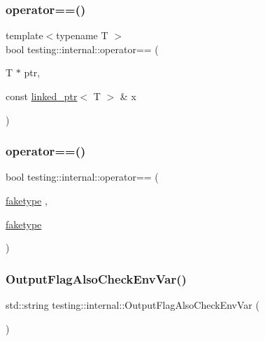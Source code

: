 \subsubsection{\texorpdfstring{operator==()}{operator==()}\hspace{0.1cm}{\footnotesize\ttfamily [1/2]}}
{\footnotesize\ttfamily template$<$typename T $>$ \\
bool testing\+::internal\+::operator== (\begin{DoxyParamCaption}\item[{T $\ast$}]{ptr,  }\item[{const \mbox{\hyperlink{classtesting_1_1internal_1_1linked__ptr}{linked\+\_\+ptr}}$<$ T $>$ \&}]{x }\end{DoxyParamCaption})\hspace{0.3cm}{\ttfamily [inline]}}

\mbox{\label{namespacetesting_1_1internal_a5e3e473798de3189e9343132bcfd4fea}} 
\subsubsection{\texorpdfstring{operator==()}{operator==()}\hspace{0.1cm}{\footnotesize\ttfamily [2/2]}}
{\footnotesize\ttfamily bool testing\+::internal\+::operator== (\begin{DoxyParamCaption}\item[{\mbox{\hyperlink{structtesting_1_1internal_1_1faketype}{faketype}}}]{,  }\item[{\mbox{\hyperlink{structtesting_1_1internal_1_1faketype}{faketype}}}]{ }\end{DoxyParamCaption})\hspace{0.3cm}{\ttfamily [inline]}}

\mbox{\label{namespacetesting_1_1internal_a0c793c6d84760d900299916c077a1af4}} 
\subsubsection{\texorpdfstring{OutputFlagAlsoCheckEnvVar()}{OutputFlagAlsoCheckEnvVar()}}
{\footnotesize\ttfamily std\+::string testing\+::internal\+::\+Output\+Flag\+Also\+Check\+Env\+Var (\begin{DoxyParamCaption}{ }\end{DoxyParamCaption})}


